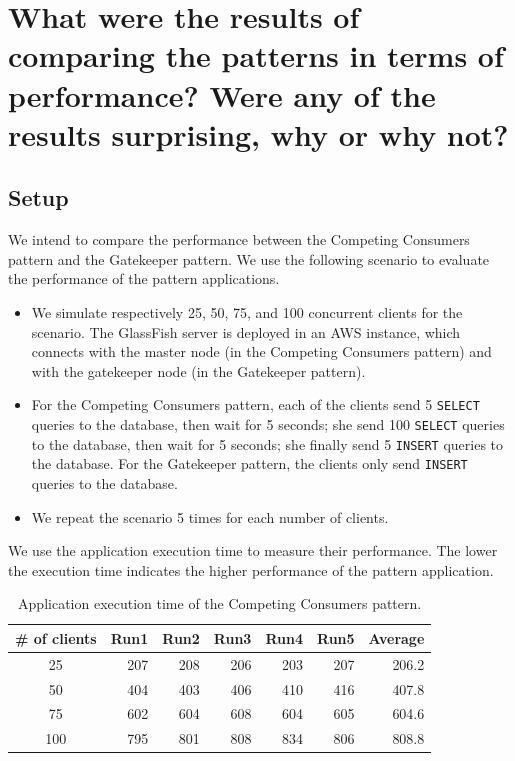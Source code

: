 \documentclass{article}
\begin{document}
\section{What were the results of comparing the patterns in terms of performance? Were any of the results surprising, why or why not?}\label{Q5}

\subsection{Setup}
We intend to compare the performance between the Competing Consumers pattern and the Gatekeeper pattern. We use the following scenario to evaluate the performance of the pattern applications. 

\begin{itemize}
\item We simulate respectively 25, 50, 75, and 100 concurrent clients for the scenario. The GlassFish server is deployed in an AWS instance, which connects with the master node (in the Competing Consumers pattern) and with the gatekeeper node (in the Gatekeeper pattern).
\item For the Competing Consumers pattern, each of the clients send 5 \texttt{SELECT} queries to the database, then wait for 5 seconds; she send 100 \texttt{SELECT} queries to the database, then wait for 5 seconds; she finally send 5 \texttt{INSERT} queries to the database. For the Gatekeeper pattern, the clients only send \texttt{INSERT} queries to the database.
\item We repeat the scenario 5 times for each number of clients.
\end{itemize}

We use the application execution time to measure their performance. The lower the execution time indicates the higher performance of the pattern application.


\begin{table}[t]
    \centering
    \caption{Application execution time of the Competing Consumers pattern.}
    \label{tab:ccp_performance}
    \begin{tabular}{|c|r|r|r|r|r|r|}
        \hline
        \textbf{\# of clients} & \textbf{Run1} & \textbf{Run2} & \textbf{Run3} & \textbf{Run4} & \textbf{Run5} & \textbf{Average}\\ \hline
        25 & 207 & 208 & 206 & 203 & 207 & 206.2 \\ \hline 
        50 & 404 & 403 & 406 & 410 & 416 & 407.8 \\ \hline
        75 & 602 & 604 & 608 & 604 & 605 & 604.6 \\ \hline
        100 & 795 & 801 & 808 & 834 & 806 & 808.8 \\ \hline
	\end{tabular}
\end{table}
\end{document}
